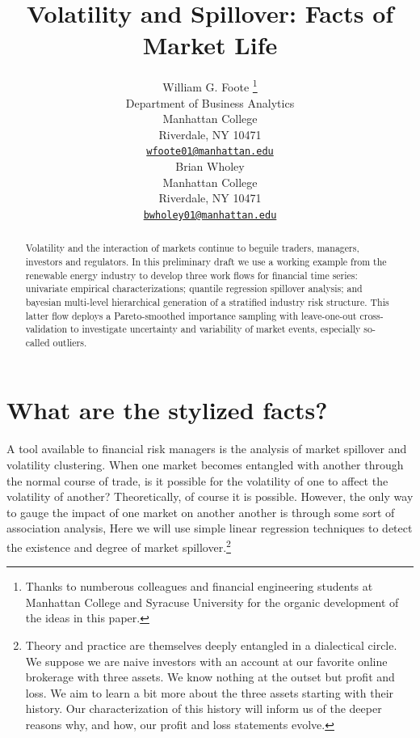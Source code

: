 \documentclass{article}
\title{Volatility and Spillover: Facts of Market Life}
\author{
    William G. Foote
    \thanks{Thanks to numberous colleagues and financial engineering
students at Manhattan College and Syracuse University for the organic
development of the ideas in this paper.}
   \\
    Department of Business Analytics \\
    Manhattan College \\
  Riverdale, NY 10471 \\
  \texttt{\href{mailto:wfoote01@manhattan.edu}{\nolinkurl{wfoote01@manhattan.edu}}} \\
   \And
    Brian Wholey
   \\
    Manhattan College \\
  Riverdale, NY 10471 \\
  \texttt{\href{mailto:bwholey01@manhattan.edu}{\nolinkurl{bwholey01@manhattan.edu}}} \\
  }
\begin{document}
\maketitle

\def\tightlist{}


\begin{abstract}
Volatility and the interaction of markets continue to beguile traders,
managers, investors and regulators. In this preliminary draft we use a
working example from the renewable energy industry to develop three work
flows for financial time series: univariate empirical characterizations;
quantile regression spillover analysis; and bayesian multi-level
hierarchical generation of a stratified industry risk structure. This
latter flow deploys a Pareto-smoothed importance sampling with
leave-one-out cross-validation to investigate uncertainty and
variability of market events, especially so-called outliers.
\end{abstract}


\hypertarget{what-are-the-stylized-facts}{%
\section{What are the stylized
facts?}\label{what-are-the-stylized-facts}}

A tool available to financial risk managers is the analysis of market
spillover and volatility clustering. When one market becomes entangled
with another through the normal course of trade, is it possible for the
volatility of one to affect the volatility of another? Theoretically, of
course it is possible. However, the only way to gauge the impact of one
market on another another is through some sort of association analysis,
Here we will use simple linear regression techniques to detect the
existence and degree of market spillover.\footnote{Theory and practice
  are themselves deeply entangled in a dialectical circle. We suppose we
  are naive investors with an account at our favorite online brokerage
  with three assets. We know nothing at the outset but profit and loss.
  We aim to learn a bit more about the three assets starting with their
  history. Our characterization of this history will inform us of the
  deeper reasons why, and how, our profit and loss statements evolve.}
\end{document}

